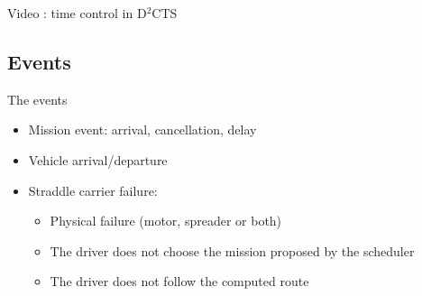 \documentclass{beamer}
\begin{document}
\begin{frame}{Video : time control in D$^2$CTS}
   \begin{center}
   \end{center}
\end{frame}

  \subsection*{Events}
  \begin{frame}{The events}
   \begin{itemize}
    \item Mission event: arrival, cancellation, delay
    \pause
    \item Vehicle arrival/departure
    \pause
    \item Straddle carrier failure:
	  \begin{itemize}
	      \item  Physical failure (motor, spreader or both) \hyperlink{Straddle Carrier Failure}{}	%
	      \item The driver does not choose the mission proposed by the scheduler
	      \item The driver does not follow the computed route
	  \end{itemize}
    \end{itemize}
  \end{frame}
\end{document}
